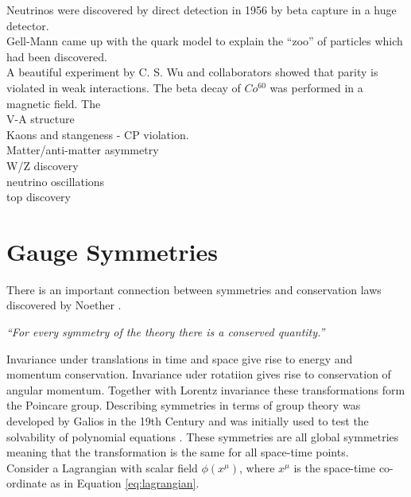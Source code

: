 Neutrinos were discovered by direct detection in 1956 by beta capture in a huge
detector. \\

Gell-Mann came up with the quark model to explain the ``zoo'' of particles which
had been discovered. \\

A beautiful experiment by C. S. Wu and collaborators showed that parity is
violated in weak interactions. The beta decay of $Co^{60}$ was performed in a
magnetic field. The  \\

V-A structure \\

Kaons and stangeness - CP violation. \\

Matter/anti-matter asymmetry \\

W/Z discovery \\

neutrino oscillations \\

top discovery \\

\section{Gauge Symmetries}

There is an important connection between symmetries and conservation laws
discovered by Noether \cite{noether}.

\begin{center}
{\it ``For every symmetry of the theory there is a conserved quantity.''} \\
\end{center}

Invariance under translations in time and space give rise to energy and momentum
conservation. Invariance uder rotatiion gives rise to conservation of angular
momentum. Together with Lorentz invariance these transformations form the
Poincare group. Describing symmetries in terms of group theory was developed by
Galios in the 19th Century and was initially used to test the solvability of 
polynomial equations \cite{galois}. These symmetries are all global symmetries
meaning that the transformation is the same for all space-time points. \\

Consider a Lagrangian with scalar field $\phi(x^{\mu})$, where $x^{\mu}$ is the
space-time co-ordinate as in Equation \ref{eq:lagrangian}.


